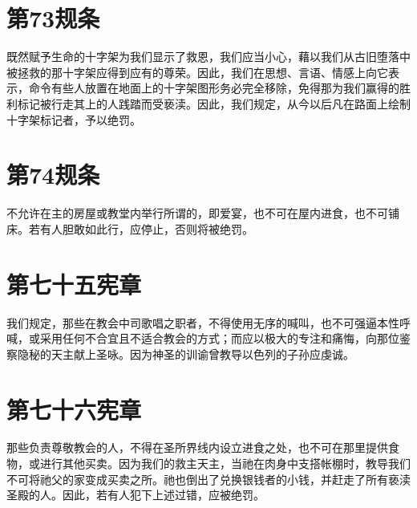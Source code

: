 
\section{第73规条}

既然赋予生命的十字架为我们显示了救恩，我们应当小心，藉以我们从古旧堕落中被拯救的那十字架应得到应有的尊荣。因此，我们在思想、言语、情感上向它表示，命令有些人放置在地面上的十字架图形务必完全移除，免得那为我们赢得的胜利标记被行走其上的人践踏而受亵渎。因此，我们规定，从今以后凡在路面上绘制十字架标记者，予以绝罚。\par


\section{第74规条}

不允许在主的房屋或教堂内举行所谓的，即爱宴，也不可在屋内进食，也不可铺床。若有人胆敢如此行，应停止，否则将被绝罚。\par


\section{第七十五宪章}

我们规定，那些在教会中司歌唱之职者，不得使用无序的喊叫，也不可强逼本性呼喊，或采用任何不合宜且不适合教会的方式；而应以极大的专注和痛悔，向那位鉴察隐秘的天主献上圣咏。因为神圣的训谕曾教导以色列的子孙应虔诚。\par


\section{第七十六宪章}

那些负责尊敬教会的人，不得在圣所界线内设立进食之处，也不可在那里提供食物，或进行其他买卖。因为我们的救主天主，当祂在肉身中支搭帐棚时，教导我们不可将祂父的家变成买卖之所。祂也倒出了兑换银钱者的小钱，并赶走了所有亵渎圣殿的人。因此，若有人犯下上述过错，应被绝罚。\par

